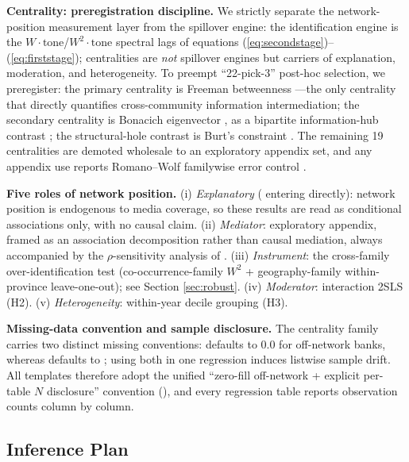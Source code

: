 \textbf{Centrality: preregistration discipline.} We strictly
separate the network-position measurement layer from the spillover
engine: the identification engine is the
$W\cdot\text{tone}$/$W^{2}\cdot\text{tone}$ spectral lags of
equations (\ref{eq:secondstage})--(\ref{eq:firststage});
centralities are \emph{not} spillover engines but carriers of
explanation, moderation, and heterogeneity. To preempt
``22-pick-3'' post-hoc selection, we preregister: the primary
centrality is Freeman betweenness 
\parencite{freeman1978centrality}---the only centrality that
directly quantifies cross-community information intermediation;
the secondary centrality is Bonacich eigenvector
 \parencite{bonacich1972factoring},
as a bipartite information-hub contrast
\parencite{borgatti1997network,han2024brokerage}; the
structural-hole contrast is Burt's constraint
 \parencite{burt1992structural}. The
remaining 19 centralities are demoted wholesale to an exploratory
appendix set, and any appendix use reports Romano--Wolf familywise
error control \parencite{romano2005stepwise}.

\textbf{Five roles of network position.} (i) \emph{Explanatory}
( entering  directly):
network position is endogenous to media coverage, so these results
are read as conditional associations only, with no causal claim.
(ii) \emph{Mediator}: exploratory appendix, framed as an
association decomposition rather than causal mediation, always
accompanied by the $\rho$-sensitivity analysis of
\textcite{imai2010identification}. (iii) \emph{Instrument}: the
cross-family over-identification test (co-occurrence-family $W^{2}$
+ geography-family within-province leave-one-out); see Section
\ref{sec:robust}. (iv) \emph{Moderator}: interaction 2SLS (H2).
(v) \emph{Heterogeneity}: within-year decile grouping (H3).

\textbf{Missing-data convention and sample disclosure.} The
centrality family carries two distinct missing conventions:
 defaults to 0.0 for off-network banks, whereas
 defaults to ; using both in
one regression induces listwise sample drift. All templates
therefore adopt the unified ``zero-fill off-network + explicit
per-table $N$ disclosure'' convention
(), and every regression
table reports observation counts column by column.

\subsection{Inference Plan}\label{subsec:inference}

